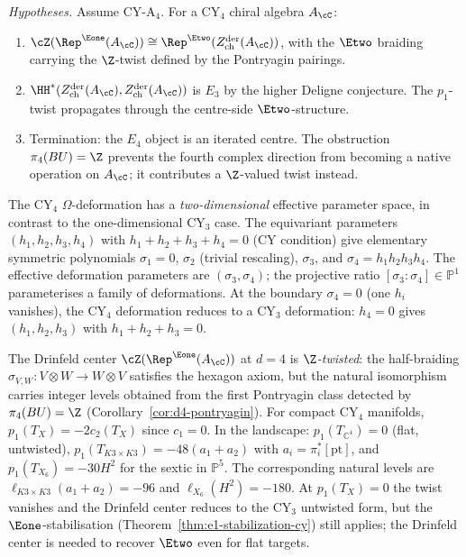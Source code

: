 \begin{proposition}[\texorpdfstring{$E_3$}{E-3} is the cascade maximum at \texorpdfstring{$d = 4$}{d = 4}]
\label{prop:e3-max-cy4}
\noindent\emph{Hypotheses.} Assume CY-A$_4$.
For a CY$_4$ chiral algebra $A_\cC$:
\begin{enumerate}[label=\textup{(\roman*)}]
 \item $\cZ(\Rep^{\Eone}(A_\cC)) \cong \Rep^{\Etwo}(Z^{\mathrm{der}}_{\mathrm{ch}}(A_\cC))$, with the $\Etwo$ braiding carrying the $\Z$-twist defined by the Pontryagin pairings.
 \item $\HH^*(Z^{\mathrm{der}}_{\mathrm{ch}}(A_\cC), Z^{\mathrm{der}}_{\mathrm{ch}}(A_\cC))$ is $E_3$ by the higher Deligne conjecture. The \(p_1\)-twist propagates through the centre-side \(\Etwo\)-structure.
 \item Termination: the \(E_4\) object is an iterated centre. The obstruction $\pi_4(BU) = \Z$ prevents the fourth complex direction from becoming a native operation on \(A_\cC\); it contributes a $\Z$-valued twist instead.
\end{enumerate}
\end{proposition}
\begin{remark}[The \texorpdfstring{$d = 4$}{d = 4} deformation space and the \texorpdfstring{$p_1$}{p-1}-twisted Drinfeld center]
\label{rem:cy4-deformation-space}
The CY$_4$ $\Omega$-deformation has a \emph{two-dimensional} effective parameter space, in contrast to the one-dimensional CY$_3$ case. The equivariant parameters $(h_1, h_2, h_3, h_4)$ with $h_1 + h_2 + h_3 + h_4 = 0$ (CY condition) give elementary symmetric polynomials $\sigma_1 = 0$, $\sigma_2$ (trivial rescaling), $\sigma_3$, and $\sigma_4 = h_1 h_2 h_3 h_4$. The effective deformation parameters are $(\sigma_3, \sigma_4)$; the projective ratio $[\sigma_3 : \sigma_4] \in \mathbb{P}^1$ parameterises a family of deformations. At the boundary $\sigma_4 = 0$ (one $h_i$ vanishes), the CY$_4$ deformation reduces to a CY$_3$ deformation: $h_4 = 0$ gives $(h_1, h_2, h_3)$ with $h_1 + h_2 + h_3 = 0$.

The Drinfeld center $\cZ(\Rep^{\Eone}(A_\cC))$ at $d = 4$ is \emph{$\Z$-twisted}: the half-braiding $\sigma_{V,W} \colon V \otimes W \to W \otimes V$ satisfies the hexagon axiom, but the natural isomorphism carries integer levels obtained from the first Pontryagin class detected by \(\pi_4(BU)=\Z\) (Corollary~\ref{cor:d4-pontryagin}). For compact CY$_4$ manifolds, \(p_1(T_X)=-2c_2(T_X)\) since \(c_1=0\). In the landscape: \(p_1(T_{\mathbb C^4})=0\) (flat, untwisted), \(p_1(T_{K3\times K3})=-48(a_1+a_2)\) with \(a_i=\pi_i^*[\mathrm{pt}]\), and \(p_1(T_{X_6})=-30H^2\) for the sextic in \(\mathbb P^5\). The corresponding natural levels are \(\ell_{K3\times K3}(a_1+a_2)=-96\) and \(\ell_{X_6}(H^2)=-180\). At \(p_1(T_X)=0\) the twist vanishes and the Drinfeld center reduces to the CY$_3$ untwisted form, but the $\Eone$-stabilisation (Theorem~\ref{thm:e1-stabilization-cy}) still applies; the Drinfeld center is needed to recover $\Etwo$ even for flat targets.
\end{remark}

